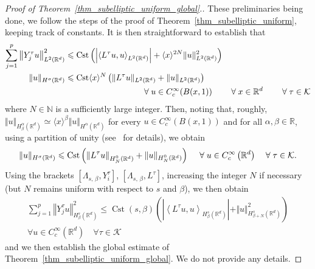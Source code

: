 \documentclass[AHL,Unicode,published]{cedram}
\newcommand*\R{\mathbb{R}}
\newcommand*\N{\mathbb{N}}
\newcommand{\calK}{\mathcal{K}}
\DeclareMathOperator{\Cst}{Cst}
\renewcommand{\leq}{\leqslant}
\let\oldforall\forall
\renewcommand*{\forall}{\mathrel{\oldforall}}
\begin{document}
\begin{proof}[Proof of Theorem~\ref{thm_subelliptic_uniform_global}.]
These preliminaries being done, we follow the steps of the proof of Theorem~\ref{thm_subelliptic_uniform}, keeping track of constants. It is then straightforward to establish that
\begin{align*}
 \sum_{j=1}^p \left\Vert Y_j^\tau u\right\Vert_{L^2\left(\R^d\right)}^2 &\leq \Cst \left(\left\vert\left\langle L^\tau u,u\right\rangle_{L^2\left(\R^d\right)}\right\vert + \langle x\rangle^{2N} \Vert u\Vert_{L^2\left(\R^d\right)}^2 \right) \\
\Vert u\Vert_{H^\sigma\left(\R^d\right)} &\leq \Cst \langle x\rangle^N \left(\Vert L^\tau u\Vert_{L^2\left(\R^d\right)} + \Vert u\Vert_{L^2\left(\R^d\right)} \right) \\
& \mkern165mu\forall u\in C_c^\infty(B(x,1))\qquad \forall x\in\R^d \qquad\forall \tau\in\calK
\end{align*}
where $N\in\N$ is a sufficiently large integer. Then, noting that, roughly, $\Vert u\Vert_{H^\alpha_\beta(\R^d)} \simeq \langle x\rangle^\beta\Vert u\Vert_{H^\alpha(\R^d)}$ for every $u\in C_c^\infty(B(x,1))$ and for all $\alpha,\beta\in\R$, using a partition of unity (see~\cite[Proof of Theorem~4.1]{EckmannHairer} for details), we obtain
\[
\Vert u\Vert_{H^\sigma\left(\R^d\right)} \leq \Cst \left(\left\Vert L^\tau u\right\Vert_{H^0_N\left(\R^d\right)} + \Vert u\Vert_{H^0_N\left(\R^d\right)} \right) \\
\quad \forall u\in C_c^\infty\left(\R^d\right) \quad\forall \tau\in\calK.
\]
Using the brackets $[\Lambda_{s,\,\beta},Y_i^\tau]$, $[\Lambda_{s,\,\beta},L^\tau]$, increasing the integer $N$ if necessary (but $N$ remains uniform with respect to $s$ and $\beta$), we then obtain
\begin{multline*}
\sum_{j=1}^p \left\Vert Y_j^\tau u\right\Vert_{H^s_\beta\left(\R^d\right)}^2 \leq \Cst(s,\beta) \left(\left\vert\left\langle L^\tau u,u\right\rangle_{H^s_\beta\left(\R^d\right)}\right\vert + \Vert u\Vert_{H^s_{\beta+N}\left(\R^d\right)}^2 \right) \\
\forall u\in C_c^\infty\left(\R^d\right) \quad\forall \tau\in\calK
\end{multline*}
and we then establish the global estimate of Theorem~\ref{thm_subelliptic_uniform_global}. We do not provide any details.
\end{proof}
\end{document}
